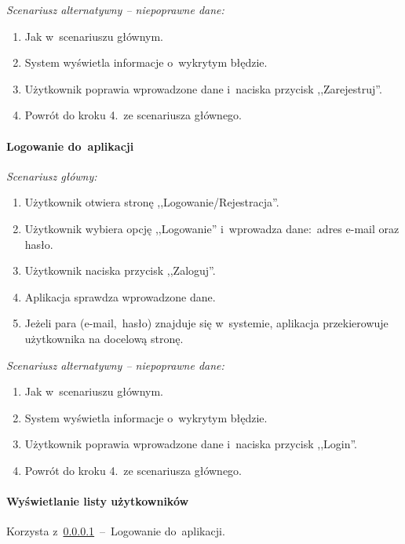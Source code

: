 \noindent \textit{Scenariusz alternatywny -- niepoprawne dane:}
\begin{enumerate}
  \item[1-4.] Jak w~scenariuszu głównym.
  \item[5.] System wyświetla informacje o~wykrytym błędzie.
  \item[6.] Użytkownik poprawia wprowadzone dane i~naciska przycisk ,,Zarejestruj''.
  \item[7.] Powrót do kroku 4.~ze scenariusza głównego.
\end{enumerate}

\paragraph{Logowanie do~aplikacji\newline}
\label{par:login}

\noindent \textit{Scenariusz główny:}
\begin{enumerate}
  \item Użytkownik otwiera stronę ,,Logowanie/Rejestracja''.
  \item Użytkownik wybiera opcję ,,Logowanie'' i~wprowadza dane:~adres e-mail oraz hasło.
  \item Użytkownik naciska przycisk ,,Zaloguj''.
  \item Aplikacja sprawdza wprowadzone dane.
  \item Jeżeli para (e-mail,~hasło) znajduje się w~systemie, aplikacja przekierowuje użytkownika na docelową stronę.
\end{enumerate}

\noindent \textit{Scenariusz alternatywny -- niepoprawne dane:}
\begin{enumerate}
  \item[1-4.] Jak w~scenariuszu głównym.
  \item[5.] System wyświetla informacje o~wykrytym błędzie.
  \item[6.] Użytkownik poprawia wprowadzone dane i~naciska przycisk ,,Login''.
  \item[7.] Powrót do kroku 4.~ze scenariusza głównego.
\end{enumerate}

\paragraph{Wyświetlanie listy użytkowników\newline}
\label{par:userList}
Korzysta z~\ref{par:login}~--~Logowanie do~aplikacji.\\

